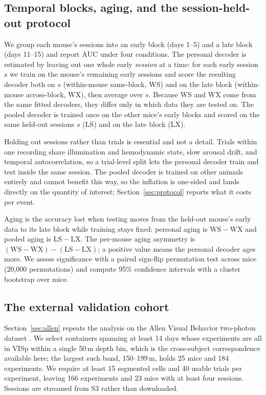 \documentclass{article}
\newcommand{\auc}{\mathrm{AUC}}
\begin{document}
\subsection{Temporal blocks, aging, and the session-held-out protocol}
\label{sec:blocks}
We group each mouse's sessions into an early block (days 1--5)
and a late block (days 11--15) and report $\auc$ under four conditions. The personal decoder is
estimated by leaving out one whole early \emph{session} at a time: for each early session $s$ we
train on the mouse's remaining early sessions and score the resulting decoder both on $s$
(within-mouse same-block, WS) and on the late block (within-mouse across-block, WX), then average
over $s$. Because WS and WX come from the same fitted decoders, they differ only in which data they
are tested on. The pooled decoder is trained once on the other mice's early blocks and scored on the
same held-out sessions $s$ (LS) and on the late block (LX).

Holding out sessions rather than trials is essential and not a detail. Trials within one recording
share illumination and hemodynamic state, slow arousal drift, and temporal autocorrelation, so a
trial-level split lets the personal decoder train and test inside the same session. The pooled
decoder is trained on other animals entirely and cannot benefit this way, so the inflation is
one-sided and lands directly on the quantity of interest; Section~\ref{sec:protocol} reports what it
costs per event.

Aging is the accuracy lost when testing moves from the held-out mouse's early data to its late block
while training stays fixed: personal aging is $\mathrm{WS}-\mathrm{WX}$ and pooled aging is
$\mathrm{LS}-\mathrm{LX}$. The per-mouse aging asymmetry is
$(\mathrm{WS}-\mathrm{WX})-(\mathrm{LS}-\mathrm{LX})$; a positive value means the personal decoder
ages more. We assess significance with a paired sign-flip permutation test across mice
(20{,}000 permutations) and compute 95\% confidence intervals with a cluster bootstrap over mice.

\subsection{The external validation cohort}
\label{sec:allencohort}
Section~\ref{sec:allen} repeats the analysis on the Allen
Visual Behavior two-photon dataset \citep{allenvb2023}. We select containers spanning at least 14
days whose experiments are all in VISp within a single 50\,\textmu m depth bin, which is the
cross-subject correspondence available here; the largest such band, 150--199\,\textmu m, holds 25
mice and 184 experiments. We require at least 15 segmented cells and 40 usable trials per
experiment, leaving 166 experiments and 23 mice with at least four sessions. Sessions are streamed
from S3 rather than downloaded.
\end{document}
